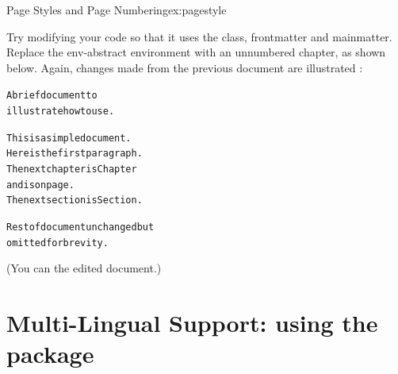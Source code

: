 \begin{exercise}{Page Styles and Page Numbering}{ex:pagestyle}

Try modifying your code so that it uses the  class,
\gls{frontmatter} and \gls{mainmatter}. Replace the
\gls{env-abstract} environment with an unnumbered chapter, as shown
below. Again, changes made from the previous document are illustrated
:\screenpagebreak
\begin{bcode}
\begin{alltt}
\oarg{12pt}







A brief document to
illustrate how to use .




This is a simple document.
Here is the first paragraph.
The next chapter is Chapter
and is on page.
The next section is Section.

 Rest of document unchanged but 
 omitted for brevity.
\end{alltt}
\end{bcode}
(You can  the edited
document.)

\end{exercise}


\section{Multi-Lingual Support: using the 
\texorpdfstring{}{babel} package}
\label{sec:babel}

